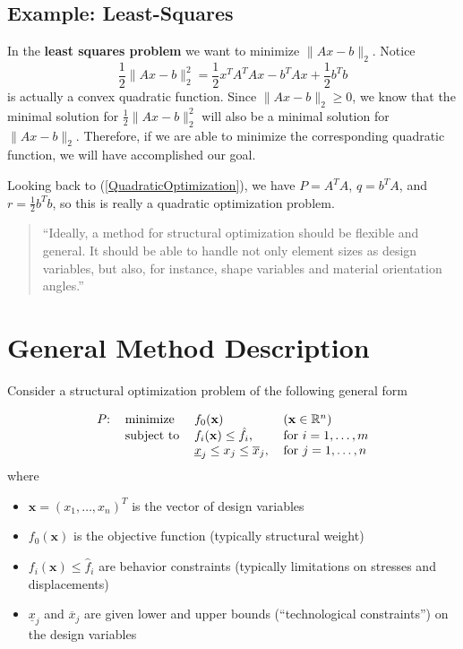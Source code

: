\documentclass[11pt]{article}
\begin{document}
\subsection{Example: Least-Squares}

In the {\color{tiananmen}\textbf{least squares problem}} we want to minimize {\color{baystate}$\|Ax-b\|_2$}. Notice {\color{baystate}$$\frac{1}{2}\|Ax-b\|_2^2=\frac{1}{2}x^TA^TAx-b^TAx+\frac{1}{2}b^Tb$$} is actually a convex quadratic function. Since $\|Ax-b\|_2\geq 0$, we know that the minimal solution for $\frac{1}{2}\|Ax-b\|_2^2$ will also be a minimal solution for $\|Ax-b\|_2$. Therefore, if we are able to minimize the corresponding quadratic function, we will have accomplished our goal.

Looking back to (\ref{QuadraticOptimization}), we have $P=A^TA$, $q=b^TA$, and $r=\frac{1}{2}b^Tb$, so this is really a quadratic optimization problem.
\\

{\huge {}}

\begin{quote}
	``Ideally, a method for structural optimization should be flexible and general. It should be able to handle not only element sizes as design variables, but also, for instance, shape variables and material orientation angles.''\cite{Svanberg1987}
\end{quote}

\section{General Method Description}
Consider a structural optimization problem of the following general form

{\color{baystate}
	\begin{equation}
		\begin{tabular}{llll}
			$P$: & minimize & $f_0(\mathbf{x})$ & $\left(\mathbf{x}\in\mathbb{R}^n\right)$ \\
			& subject to & $f_i(\mathbf{x})\leq\hat{f}_i$, & for $i=1,\ldots,m$ \\
			&  & $\underline{x}_j\leq x_j\leq \overline{x}_j$, & for $j=1,\ldots,n$
		\end{tabular}
	\end{equation}
}
where
\begin{itemize}
	\item $\mathbf{x}=\left(x_1,\ldots,x_n\right)^T$ is the vector of {\color{tiananmen}design variables}
	\item $f_0(\mathbf{x})$ is the {\color{tiananmen}objective function} (typically structural weight)
	\item $f_i(\mathbf{x})\leq\hat{f}_i$ are {\color{tiananmen}behavior constraints} (typically limitations on stresses and displacements)
	\item $\underline{x}_j$ and $\overline{x}_j$ are given {\color{tiananmen}lower and upper bounds} (``technological constraints'') {\color{tiananmen}on the design variables}
\end{itemize}
\end{document}

